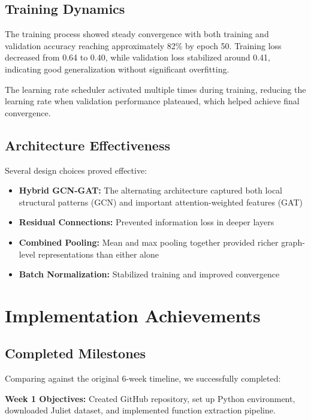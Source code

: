 \subsection{Training Dynamics}

The training process showed steady convergence with both training and validation accuracy reaching approximately 82\% by epoch 50. Training loss decreased from 0.64 to 0.40, while validation loss stabilized around 0.41, indicating good generalization without significant overfitting.

The learning rate scheduler activated multiple times during training, reducing the learning rate when validation performance plateaued, which helped achieve final convergence.

\subsection{Architecture Effectiveness}

Several design choices proved effective:
\begin{itemize}
\item \textbf{Hybrid GCN-GAT:} The alternating architecture captured both local structural patterns (GCN) and important attention-weighted features (GAT)
\item \textbf{Residual Connections:} Prevented information loss in deeper layers
\item \textbf{Combined Pooling:} Mean and max pooling together provided richer graph-level representations than either alone
\item \textbf{Batch Normalization:} Stabilized training and improved convergence
\end{itemize}

\section{Implementation Achievements}

\subsection{Completed Milestones}

Comparing against the original 6-week timeline, we successfully completed:

\textbf{Week 1 Objectives:}  Created GitHub repository, set up Python environment, downloaded Juliet dataset, and implemented function extraction pipeline.

